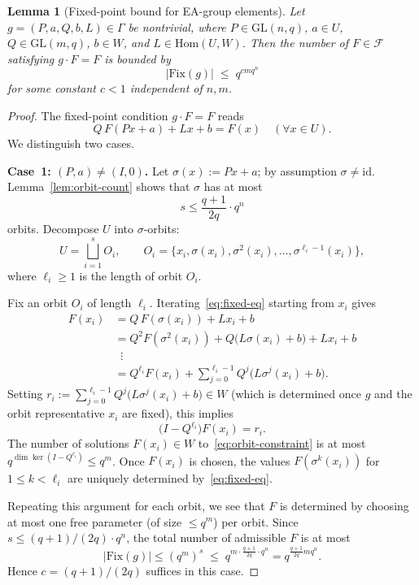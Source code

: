 \documentclass[10pt,a4paper]{amsart}
\newtheorem{lemma}{Lemma}
\newcommand{\Fcal}{\mathcal{F}}
\newcommand{\Fix}{\mathrm{Fix}}
\newcommand{\GL}{\mathrm{GL}}
\newcommand{\Gam}{\Gamma}
\newcommand{\Hom}{\mathrm{Hom}}
\newcommand{\id}{\mathrm{id}}
\begin{document}
\begin{lemma}[Fixed-point bound for EA-group elements]\label{lem:fix-g}
Let $g=(P,a,Q,b,L)\in \Gam$ be nontrivial, where $P\in\GL(n,q)$, $a\in U$,
$Q\in\GL(m,q)$, $b\in W$, and $L\in\Hom(U,W)$.
Then the number of $F\in\Fcal$ satisfying $g\cdot F = F$ is bounded by
\[
   |\Fix(g)| \;\le\; q^{cmq^n}
\]
for some constant $c<1$ independent of $n,m$.
\end{lemma}

\begin{proof}
The fixed-point condition $g\cdot F=F$ reads
\begin{equation}\label{eq:fixed-eq}
   Q\,F(Px+a) + Lx + b = F(x)
   \quad(\forall x\in U).
\end{equation}
We distinguish two cases.

\medskip
\noindent\textbf{Case~1: $(P,a)\neq(I,0)$.}
Let $\sigma(x):=Px+a$; by assumption $\sigma\neq\id$.
Lemma~\ref{lem:orbit-count} shows that $\sigma$ has at most
\[
   s\le\frac{q+1}{2q}\cdot q^n
\]
orbits.
Decompose $U$ into $\sigma$-orbits:
\[
   U = \bigsqcup_{i=1}^s O_i,
   \qquad O_i = \{x_i,\sigma(x_i),\sigma^2(x_i),\dots,\sigma^{\ell_i-1}(x_i)\},
\]
where $\ell_i\ge 1$ is the length of orbit $O_i$.

Fix an orbit $O_i$ of length $\ell_i$.
Iterating~\eqref{eq:fixed-eq} starting from $x_i$ gives
\begin{align*}
   F(x_i)
      &= Q\,F(\sigma(x_i)) + Lx_i + b \\
      &= Q^2 F(\sigma^2(x_i)) + Q\bigl(L\sigma(x_i)+b\bigr) + Lx_i + b \\
      &\;\;\vdots \\
      &= Q^{\ell_i}F(x_i) + \sum_{j=0}^{\ell_i-1}Q^j\bigl(L\sigma^j(x_i)+b\bigr).
\end{align*}
Setting $r_i:=\sum_{j=0}^{\ell_i-1}Q^j\bigl(L\sigma^j(x_i)+b\bigr)\in W$ (which is
determined once $g$ and the orbit representative $x_i$ are fixed), this implies
\begin{equation}\label{eq:orbit-constraint}
   \bigl(I - Q^{\ell_i}\bigr) F(x_i) = r_i.
\end{equation}
The number of solutions $F(x_i)\in W$ to~\eqref{eq:orbit-constraint} is at most
$q^{\dim\ker(I-Q^{\ell_i})}\le q^m$.
Once $F(x_i)$ is chosen, the values $F(\sigma^k(x_i))$ for $1\le k<\ell_i$ are
uniquely determined by~\eqref{eq:fixed-eq}.

Repeating this argument for each orbit, we see that $F$ is determined by
choosing at most one free parameter (of size $\le q^m$) per orbit.
Since $s\le (q+1)/(2q)\cdot q^n$, the total number of admissible $F$ is at most
\[
   |\Fix(g)| \le (q^m)^s \;\le\; q^{m\cdot\frac{q+1}{2q}\cdot q^n}
   = q^{\frac{q+1}{2q}mq^n}.
\]
Hence $c=(q+1)/(2q)$ suffices in this case.


\end{proof}
\end{document}
